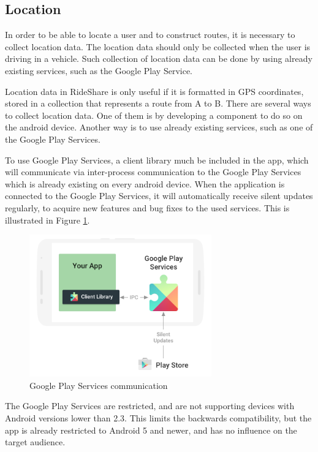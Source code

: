 \subsection{Location}
In order to be able to locate a user and to construct routes, it is necessary to collect location data. 
The location data should only be collected when the user is driving in a vehicle. 
Such collection of location data can be done by using already existing services, such as the Google Play Service.

Location data in RideShare is only useful if it is formatted in GPS coordinates, stored in a collection that represents a route from A to B.
There are several ways to collect location data. 
One of them is by developing a component to do so on the android device. 
Another way is to use already existing services, such as one of the Google Play Services.

To use Google Play Services, a client library much be included in the app, which will communicate via inter-process communication to the Google Play Services which is already existing on every android device. 
When the application is connected to the Google Play Services, it will automatically receive silent updates regularly, to acquire new features and bug fixes to the used services. 
This is illustrated in Figure \ref{fig:gapifigure}\cite{GapiOverview}.

\begin{figure}[h]
	\centering
	\includegraphics[width=0.7\textwidth]{figures/play-services-diagram.png}
	\caption{Google Play Services communication\cite{GapiFigure}}
	\label{fig:gapifigure}
\end{figure}

The Google Play Services are restricted, and are not supporting devices with Android versions lower than 2.3. 
This limits the backwards compatibility, but the app is already restricted to Android 5 and newer, and has no influence on the target audience.

